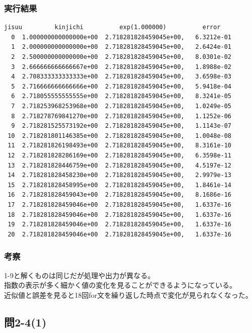 \documentclass{jarticle}
\begin{document}
\subsubsection{実行結果\\}
\begin{breakbox}
\begin{verbatim}
jisuu         kinjichi          exp(1.000000)          error
  0  1.000000000000000e+00  2.718281828459045e+00,   6.3212e-01
  1  2.000000000000000e+00  2.718281828459045e+00,   2.6424e-01
  2  2.500000000000000e+00  2.718281828459045e+00,   8.0301e-02
  3  2.666666666666667e+00  2.718281828459045e+00,   1.8988e-02
  4  2.708333333333333e+00  2.718281828459045e+00,   3.6598e-03
  5  2.716666666666666e+00  2.718281828459045e+00,   5.9418e-04
  6  2.718055555555555e+00  2.718281828459045e+00,   8.3241e-05
  7  2.718253968253968e+00  2.718281828459045e+00,   1.0249e-05
  8  2.718278769841270e+00  2.718281828459045e+00,   1.1252e-06
  9  2.718281525573192e+00  2.718281828459045e+00,   1.1143e-07
 10  2.718281801146385e+00  2.718281828459045e+00,   1.0048e-08
 11  2.718281826198493e+00  2.718281828459045e+00,   8.3161e-10
 12  2.718281828286169e+00  2.718281828459045e+00,   6.3598e-11
 13  2.718281828446759e+00  2.718281828459045e+00,   4.5197e-12
 14  2.718281828458230e+00  2.718281828459045e+00,   2.9979e-13
 15  2.718281828458995e+00  2.718281828459045e+00,   1.8461e-14
 16  2.718281828459043e+00  2.718281828459045e+00,   8.1686e-16
 17  2.718281828459046e+00  2.718281828459045e+00,   1.6337e-16
 18  2.718281828459046e+00  2.718281828459045e+00,   1.6337e-16
 19  2.718281828459046e+00  2.718281828459045e+00,   1.6337e-16
 20  2.718281828459046e+00  2.718281828459045e+00,   1.6337e-16
\end{verbatim}
\end{breakbox}
\subsubsection{考察\\}
1-9と解くものは同じだが処理や出力が異なる。\\
指数の表示が多く細かく値の変化を見ることができるようになっている。\\
近似値と誤差を見ると18回for文を繰り返した時点で変化が見られなくなった。\\


\subsection{問2-4(1)\\}
\end{document}
